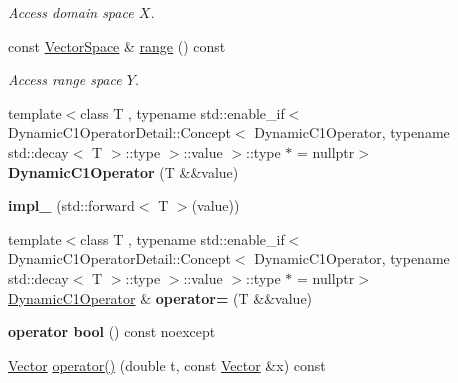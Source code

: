 \begin{DoxyCompactItemize}
\begin{DoxyCompactList}\small\item\em Access domain space $X$. \end{DoxyCompactList}\item 
\hypertarget{classSpacy_1_1DynamicC1Operator_a15daaabb27566457a0a3df02a13f9d96}{const \hyperlink{classSpacy_1_1VectorSpace}{Vector\-Space} \& \hyperlink{classSpacy_1_1DynamicC1Operator_a15daaabb27566457a0a3df02a13f9d96}{range} () const }\label{classSpacy_1_1DynamicC1Operator_a15daaabb27566457a0a3df02a13f9d96}

\begin{DoxyCompactList}\small\item\em Access range space $Y$. \end{DoxyCompactList}\item 
\hypertarget{classSpacy_1_1DynamicC1Operator_a9eeca088eb41c043b63c4b583f56d5ff}{{\footnotesize template$<$class T , typename std\-::enable\-\_\-if$<$ Dynamic\-C1\-Operator\-Detail\-::\-Concept$<$ Dynamic\-C1\-Operator, typename std\-::decay$<$ T $>$\-::type $>$\-::value $>$\-::type $\ast$  = nullptr$>$ }\\{\bfseries Dynamic\-C1\-Operator} (T \&\&value)}\label{classSpacy_1_1DynamicC1Operator_a9eeca088eb41c043b63c4b583f56d5ff}

\item 
\hypertarget{classSpacy_1_1DynamicC1Operator_a088f10c5b17d86962d7c6be8a9708597}{{\bfseries impl\-\_\-} (std\-::forward$<$ T $>$(value))}\label{classSpacy_1_1DynamicC1Operator_a088f10c5b17d86962d7c6be8a9708597}

\item 
\hypertarget{classSpacy_1_1DynamicC1Operator_a30da03500f47757230e26cd0eb5a684b}{{\footnotesize template$<$class T , typename std\-::enable\-\_\-if$<$ Dynamic\-C1\-Operator\-Detail\-::\-Concept$<$ Dynamic\-C1\-Operator, typename std\-::decay$<$ T $>$\-::type $>$\-::value $>$\-::type $\ast$  = nullptr$>$ }\\\hyperlink{classSpacy_1_1DynamicC1Operator}{Dynamic\-C1\-Operator} \& {\bfseries operator=} (T \&\&value)}\label{classSpacy_1_1DynamicC1Operator_a30da03500f47757230e26cd0eb5a684b}

\item 
\hypertarget{classSpacy_1_1DynamicC1Operator_a96e8e4291ea083b224d5e8efdab87ed7}{{\bfseries operator bool} () const noexcept}\label{classSpacy_1_1DynamicC1Operator_a96e8e4291ea083b224d5e8efdab87ed7}

\item 
\hypertarget{classSpacy_1_1DynamicC1Operator_a0859e4c204d9599769c42ca4147f1875}{\hyperlink{classSpacy_1_1Vector}{Vector} \hyperlink{classSpacy_1_1DynamicC1Operator_a0859e4c204d9599769c42ca4147f1875}{operator()} (double t, const \hyperlink{classSpacy_1_1Vector}{Vector} \&x) const }\label{classSpacy_1_1DynamicC1Operator_a0859e4c204d9599769c42ca4147f1875}


\end{DoxyCompactItemize}
